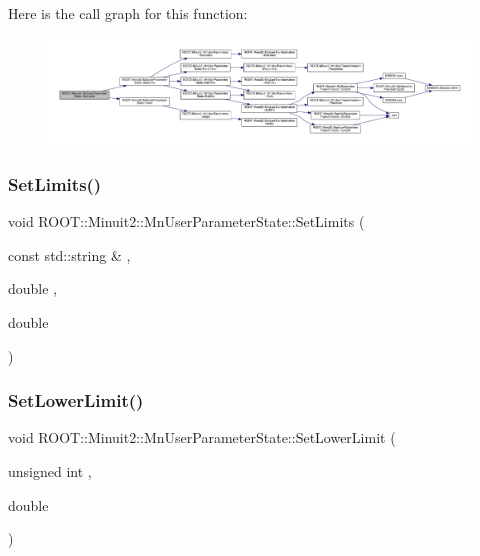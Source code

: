 Here is the call graph for this function\+:\nopagebreak
\begin{figure}[H]
\begin{center}
\leavevmode
\includegraphics[width=350pt]{d3/de0/classROOT_1_1Minuit2_1_1MnUserParameterState_ab178dda717939b16da948c96d2180b89_cgraph}
\end{center}
\end{figure}
\mbox{\label{classROOT_1_1Minuit2_1_1MnUserParameterState_ab178dda717939b16da948c96d2180b89}} 
\subsubsection{\texorpdfstring{SetLimits()}{SetLimits()}\hspace{0.1cm}{\footnotesize\ttfamily [4/4]}}
{\footnotesize\ttfamily void R\+O\+O\+T\+::\+Minuit2\+::\+Mn\+User\+Parameter\+State\+::\+Set\+Limits (\begin{DoxyParamCaption}\item[{const std\+::string \&}]{,  }\item[{double}]{,  }\item[{double}]{ }\end{DoxyParamCaption})}

\mbox{\label{classROOT_1_1Minuit2_1_1MnUserParameterState_ae2601510da37a8571b0b22fe0e960b51}} 
\subsubsection{\texorpdfstring{SetLowerLimit()}{SetLowerLimit()}\hspace{0.1cm}{\footnotesize\ttfamily [1/4]}}
{\footnotesize\ttfamily void R\+O\+O\+T\+::\+Minuit2\+::\+Mn\+User\+Parameter\+State\+::\+Set\+Lower\+Limit (\begin{DoxyParamCaption}\item[{unsigned int}]{,  }\item[{double}]{ }\end{DoxyParamCaption})}


